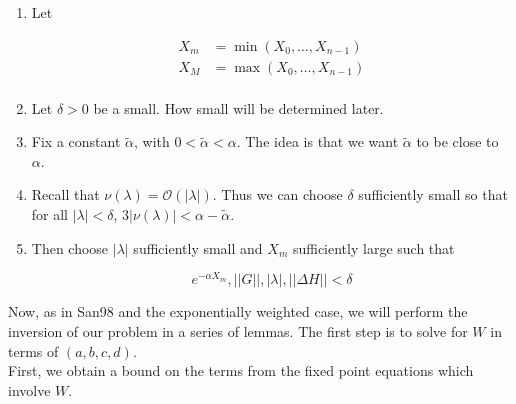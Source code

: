 \documentclass[12pt]{article}
\begin{document}
\begin{enumerate}

	\item Let

	\begin{align*}
	X_m &= \min(X_0, \dots, X_{n-1}) \\
	X_M &= \max(X_0, \dots, X_{n-1}) \\
	\end{align*}

	\item Let $\delta > 0$ be a small. How small will be determined later.

	\item Fix a constant $\tilde{\alpha}$, with $0 < \tilde{\alpha} < \alpha$. The idea is that we want $\tilde{\alpha}$ to be close to $\alpha$.

	\item Recall that $\nu(\lambda) = \mathcal{O}(|\lambda|)$. Thus we can choose $\delta$ sufficiently small so that for all $|\lambda| < \delta$, $3|\nu(\lambda)| < \alpha - \tilde{\alpha}$.

	\item Then choose $|\lambda|$ sufficiently small and $X_m$ sufficiently large such that

	\begin{equation}
	e^{-\alpha X_m}, ||G||, |\lambda|, ||\Delta H|| < \delta
	\end{equation}

\end{enumerate}


Now, as in San98 and the exponentially weighted case, we will perform the inversion of our problem in a series of lemmas. The first step is to solve for $W$ in terms of $(a, b, c, d)$.\\

First, we obtain a bound on the terms from the fixed point equations which involve $W$. 

\end{document}

